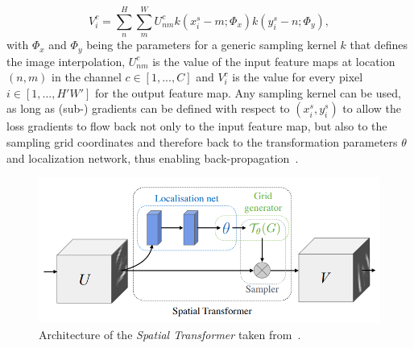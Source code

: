 \begin{equation}
	V_i^c = \sum^{H}_{n} \sum^{W}_{m} U_{nm}^c k(x_i^s - m; \Phi_x) k(y_i^s - n; \Phi_y),
\end{equation}
with $\Phi_x$ and $\Phi_y$ being the parameters for a generic sampling  kernel $k$ that defines the image interpolation, $U_{nm}^c$ is the value of the input feature maps at location $(n,m)$ in the channel $c \in [1, ..., C]$ and $V_i^c$ is the value for every pixel $i \in [1, ..., H'W']$ for the output feature map. Any sampling kernel can be used, as long as (sub-) gradients can be defined with respect to $(x_i^s, y_i^s)$ to allow the loss gradients to flow back not only to the input feature map, but also to the sampling grid coordinates and therefore back to the transformation parameters $\theta$ and localization network, thus enabling back-propagation~\cite{SpatialTransformer}.
\begin{figure}[h] %
	\centering
	\graphicspath{{images/}{\main/images/}}
	\includegraphics[width=\linewidth]{SpatialTransformer.png} 
	\caption{Architecture of the \emph{Spatial Transformer} taken from~\cite{SpatialTransformer}.}
	\label{fig:SpatialTransformer}
\end{figure}


